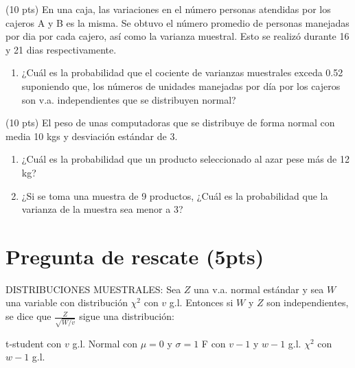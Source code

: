 \documentclass[addpoints]{exam}
\theoremstyle{mytheor}
\begin{document}
\begin{questions}
  
  \question (10 pts) 
  En una caja, las variaciones en el número personas atendidas por los cajeros A y B es la misma. Se obtuvo el número promedio de personas manejadas por dia por cada cajero, así como la varianza muestral. Esto se realizó durante 16 y 21 dias respectivamente. 
  \begin{enumerate}
  \item ¿Cuál es la probabilidad que el cociente de varianzas muestrales exceda 0.52 suponiendo que, los números de unidades manejadas por día por los cajeros son v.a. independientes que se distribuyen normal?
  \end{enumerate}
  
  
  \question (10 pts)
  El peso de unas computadoras que se distribuye de forma normal con media 10 kgs y desviación estándar de 3. 
  \begin{enumerate}
  \item ¿Cuál es la probabilidad que un producto seleccionado al azar pese más de 12 kg?
  \item ¿Si se toma una muestra de 9 productos, ¿Cuál es la probabilidad que la varianza de la muestra sea menor a 3?
  \end{enumerate}
  
  
  
  \end{questions}
  
  
  
  
  
  
  
  \section*{Pregunta de rescate (5pts)}
  
  \begin{questions}
  \question DISTRIBUCIONES MUESTRALES: Sea $Z$ una v.a. normal estándar y sea $W$ una variable con distribución $\chi^2$ con $v$ g.l. Entonces si $W$ y $Z$ son independientes, se dice que $\frac{Z}{\sqrt{W/v}}$ sigue una distribución:
    
    \begin{checkboxes}
  \choice t-student con $v$ g.l.
  \choice Normal con $\mu = 0$ y $\sigma = 1$ 
    \choice F con $v-1$ y $w-1$ g.l.
  \choice $\chi^2$ con $w-1$ g.l.
  \end{checkboxes}
  
  \end{questions}
  
  
  
  
\end{document}
